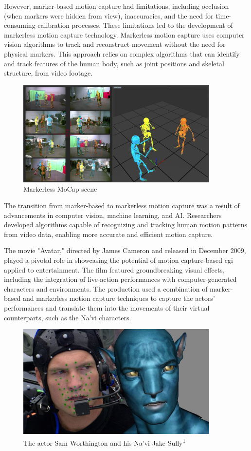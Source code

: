 However, marker-based motion capture had limitations, including occlusion 
(when markers were hidden from view), inaccuracies, and the need for time-consuming calibration processes. 
These limitations led to the development of markerless motion capture technology. 
Markerless motion capture uses computer vision algorithms to track and reconstruct movement without the need for physical markers. 
This approach relies on complex algorithms that can identify and track features of the human body, 
such as joint positions and skeletal structure, from video footage.
\begin{figure}[H]
    \centering
    \includegraphics[width=0.9\textwidth]{graphics/MoCapMarkerlessQualisys.png}
    \caption{Markerless MoCap scene}
\end{figure}

The transition from marker-based to markerless motion capture was a result of advancements in computer vision, machine learning, and AI. 
Researchers developed algorithms capable of recognizing and tracking human motion patterns from video data, 
enabling more accurate and efficient motion capture.

The movie "Avatar," directed by James Cameron and released in December 2009, 
played a pivotal role in showcasing the potential of motion capture-based cgi applied to entertainment. 
The film featured groundbreaking visual effects, 
including the integration of live-action performances with computer-generated characters and environments. 
The production used a combination of marker-based and markerless motion capture techniques to capture the actors' 
performances and translate them into the movements of their virtual counterparts, such as the Na'vi characters.
\begin{figure}[H]
    \centering
    \includegraphics[width=0.9\textwidth]{graphics/avatar_markers.jpg}
    \caption[]{The actor Sam Worthington and his Na'vi Jake Sully\textsuperscript{1}}
\end{figure}

